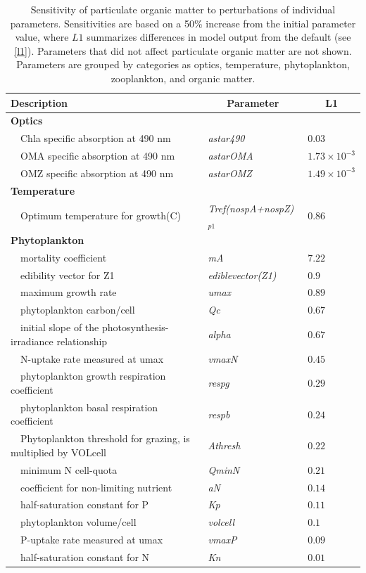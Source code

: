 \documentclass[letterpaper,12pt,oneside]{article}\usepackage[]{graphicx}\usepackage[]{color}
\begin{document}
\begin{table}[!tbp]
{\footnotesize
\caption{Sensitivity of particulate organic matter to perturbations of individual parameters.  Sensitivities are based on a 50\% increase from the initial parameter value, where $L1$ summarizes differences in model output from the default (see \cref{l1}).  Parameters that did not affect particulate organic matter are not shown.  Parameters are grouped by categories as optics, temperature, phytoplankton, zooplankton, and organic matter.\label{tab:om1sens}} 
\begin{center}
\begin{tabular}{lll}
\hline\hline
\multicolumn{1}{l}{Description}&\multicolumn{1}{c}{Parameter}&\multicolumn{1}{c}{L1}\tabularnewline
\hline
{\bfseries Optics}&&\tabularnewline
~~Chla specific absorption at 490 nm&\textit{astar490}&$0.03$\tabularnewline
~~OMA specific absorption at 490 nm&\textit{astarOMA}&$1.73\times 10^{-3}$\tabularnewline
~~OMZ specific absorption at 490 nm&\textit{astarOMZ}&$1.49\times 10^{-3}$\tabularnewline
\hline
{\bfseries Temperature}&&\tabularnewline
~~Optimum temperature for growth(C)&\textit{Tref(nospA+nospZ)$_{p1}$}&$0.86$\tabularnewline
\hline
{\bfseries Phytoplankton}&&\tabularnewline
~~mortality coefficient&\textit{mA}&$7.22$\tabularnewline
~~edibility vector for Z1&\textit{ediblevector(Z1)}&$0.9$\tabularnewline
~~maximum growth rate&\textit{umax}&$0.89$\tabularnewline
~~phytoplankton carbon/cell&\textit{Qc}&$0.67$\tabularnewline
~~initial slope of the photosynthesis-irradiance relationship&\textit{alpha}&$0.67$\tabularnewline
~~N-uptake rate measured at umax&\textit{vmaxN}&$0.45$\tabularnewline
~~phytoplankton growth respiration coefficient&\textit{respg}&$0.29$\tabularnewline
~~phytoplankton basal respiration coefficient&\textit{respb}&$0.24$\tabularnewline
~~Phytoplankton threshold for grazing, is multiplied by VOLcell&\textit{Athresh}&$0.22$\tabularnewline
~~minimum N cell-quota&\textit{QminN}&$0.21$\tabularnewline
~~coefficient for non-limiting nutrient&\textit{aN}&$0.14$\tabularnewline
~~half-saturation constant for P&\textit{Kp}&$0.11$\tabularnewline
~~phytoplankton volume/cell&\textit{volcell}&$0.1$\tabularnewline
~~P-uptake rate measured at umax&\textit{vmaxP}&$0.09$\tabularnewline
~~half-saturation constant for N&\textit{Kn}&$0.01$\tabularnewline

\end{tabular}
\end{center}}
\end{table}
\end{document}
